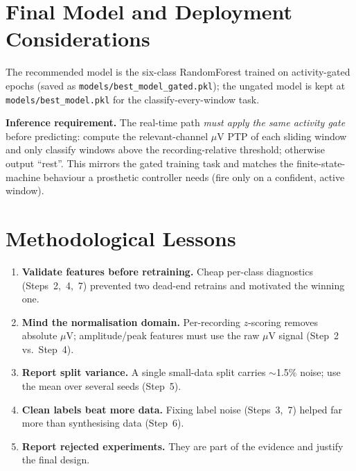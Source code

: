 \documentclass[11pt,a4paper]{article}
\newcommand{\muv}{$\mu$V}
\newcommand{\code}[1]{\texttt{#1}}
\begin{document}
\section{Final Model and Deployment Considerations}
The recommended model is the six-class RandomForest trained on
activity-gated epochs (saved as \code{models/best\_model\_gated.pkl}); the
ungated model is kept at \code{models/best\_model.pkl} for the
classify-every-window task.

\textbf{Inference requirement.} The real-time path \emph{must apply the same
activity gate} before predicting: compute the relevant-channel \muv{} PTP of each
sliding window and only classify windows above the recording-relative threshold;
otherwise output ``rest''. This mirrors the gated training task and matches the
finite-state-machine behaviour a prosthetic controller needs (fire only on a
confident, active window).

\section{Methodological Lessons}
\begin{enumerate}[noitemsep]
  \item \textbf{Validate features before retraining.} Cheap per-class diagnostics
  (Steps~2,~4,~7) prevented two dead-end retrains and motivated the winning one.
  \item \textbf{Mind the normalisation domain.} Per-recording $z$-scoring removes
  absolute \muv{}; amplitude/peak features must use the raw \muv{} signal
  (Step~2 vs.\ Step~4).
  \item \textbf{Report split variance.} A single small-data split carries
  $\sim$1.5\% noise; use the mean over several seeds (Step~5).
  \item \textbf{Clean labels beat more data.} Fixing label noise (Steps~3,~7)
  helped far more than synthesising data (Step~6).
  \item \textbf{Report rejected experiments.} They are part of the evidence and
  justify the final design.
\end{enumerate}

\end{document}
